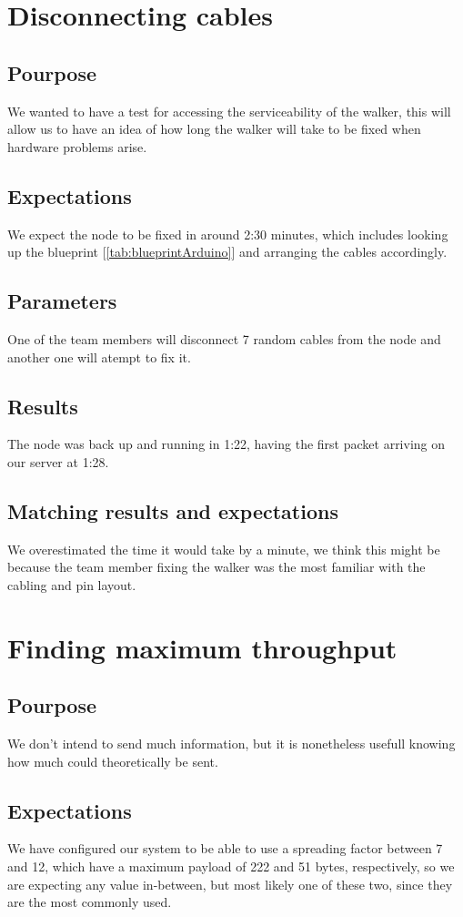 \section{Disconnecting cables}

	\subsection{Pourpose}
		We wanted to have a test for accessing the serviceability of the walker, this will allow us to have an idea of how long the walker will take to be fixed when hardware problems arise.
	\subsection{Expectations}
		We expect the node to be fixed in around 2:30 minutes, which includes looking up the blueprint [\ref{tab:blueprintArduino}] and arranging the cables accordingly.
	\subsection{Parameters}
		One of the team members will disconnect 7 random cables from the node and another one will atempt to fix it.
	\subsection{Results}
		The node was back up and running in 1:22, having the first packet arriving on our server at 1:28.
	\subsection{Matching results and expectations}
		We overestimated the time it would take by a minute, we think this might be because the team member fixing the walker was the most familiar with the cabling and pin layout.

\section{Finding maximum throughput}

	\subsection*{Pourpose}
		We don't intend to send much information, but it is nonetheless usefull knowing how much could theoretically be sent.
	\subsection*{Expectations}
		We have configured our system to be able to use a spreading factor between 7 and 12, which have a maximum payload of 222 and 51 bytes, respectively, so we are expecting any value in-between, but most likely one of these two, since they are the most commonly used.
